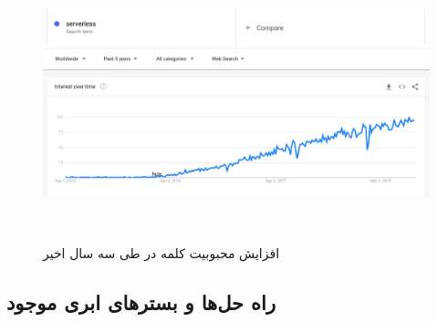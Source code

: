 \begin{figure}[!h]
	\centering
	\includegraphics[height=8cm]{Images/serverless_google_trends}
	\caption{افزایش محبوبیت کلمه  ‌‌در  طی سه سال اخیر}
	\label{تصویر 2-1}
\end{figure}

\subsection{راه حل‌ها و بسترهای ابری موجود}

